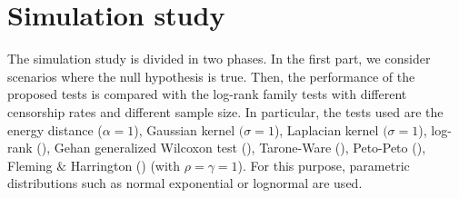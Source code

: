 \documentclass[11pt]{article}
\newtheorem{remark}{Remark}
\begin{document}
	










\section{Simulation study}
\label{sec:simulation}

The simulation study is divided in two phases. In the first part, we consider scenarios where the null hypothesis is true. Then, the performance of the proposed tests is compared with the log-rank family tests with different censorship rates and different sample size.  In particular, the tests used are the energy distance ($\alpha=1$), Gaussian kernel $(\sigma=1$), Laplacian kernel $(\sigma=1$),
log-rank (\cite{mantel1959statistical}), Gehan generalized Wilcoxon test (\cite{gehan1965generalized}), Tarone-Ware (\cite{tarone1977distribution}), Peto-Peto (\cite{peto1972asymptotically}), Fleming $\&$ Harrington (\cite{fleming1981class}) (with $\rho=\gamma=1$). For this purpose, parametric distributions such as normal exponential or lognormal are used.  

\end{document}
